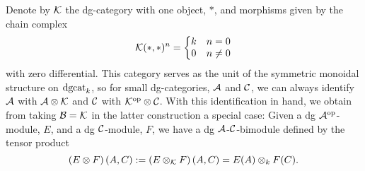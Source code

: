 \begin{remark}\label{rem: tensor over k}
  Denote by \(\mathcal{K}\) the dg-category with one object, \(\ast\), and morphisms given by the chain complex
  \[\mathcal{K}(\ast,\ast)^n =
  \left\{ \begin{matrix}
    k & n = 0\\
    0 & n \neq 0
  \end{matrix}\right.\]  with zero differential.
  This category serves as the unit of the symmetric monoidal structure on \(\operatorname{dgcat}_k\), so for small dg-categories, \(\mathcal{A}\) and \(\mathcal{C}\), we can always identify \(\mathcal{A}\) with \(\mathcal{A} \otimes \mathcal{K}\) and \(\mathcal{C}\) with \(\mathcal{K}^{\operatorname{op}} \otimes \mathcal{C}\).
  With this identification in hand, we obtain from taking \(\mathcal{B} = \mathcal{K}\) in the latter construction a special case:
  Given a dg \(\mathcal{A}^{\operatorname{op}}\)-module, \(E\), and a dg \(\mathcal{C}\)-module, \(F\), we have a dg \(\mathcal{A}\)-\(\mathcal{C}\)-bimodule defined by the tensor product
  \[\left(E \otimes F\right)(A,C) := \left(E \otimes_{\mathcal{K}} F\right)(A,C) = E(A) \otimes_k F(C).\]
\end{remark}

